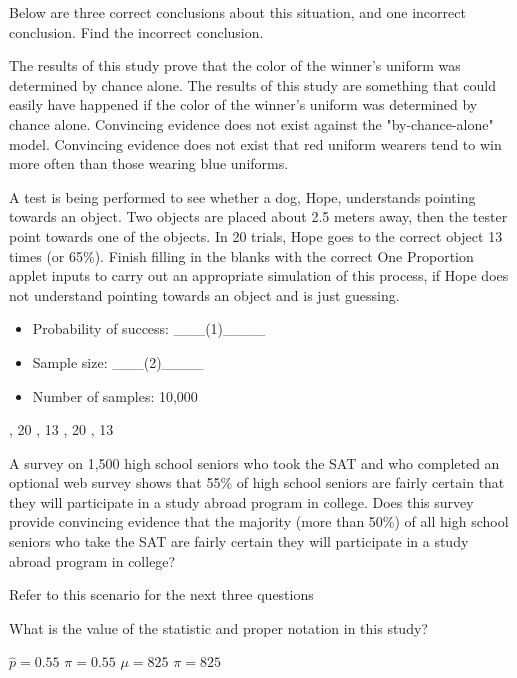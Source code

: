 \documentclass{article}
\begin{document}
\begin{mcquestions}
		\question[follow] Below are three correct conclusions about this situation, and one incorrect conclusion.  Find the incorrect conclusion.
		\begin{mcanswerslist}
		\answer[correct] The results of this study prove that the color of the winner's uniform was determined by chance alone.
		\answer The results of this study are something that could easily have happened if the color of the winner's uniform was determined by chance alone.
		\answer Convincing evidence does not exist against the "by-chance-alone" model.
		\answer Convincing evidence does not exist that red uniform wearers tend to win more often than those wearing blue uniforms.
		\end{mcanswerslist}
		
		\question A test is being performed to see whether a dog, Hope, understands pointing towards an object. Two objects are placed about 2.5 meters away, then the tester point towards one of the objects. In 20 trials, Hope goes to the correct object 13 times (or 65\%).
		Finish filling in the blanks with the correct One Proportion applet inputs to carry out an appropriate simulation of this process, if Hope does not understand pointing towards an object and is just guessing.
		\begin{itemize}
			\item Probability of success: \_\_\_(1)\_\_\_\_
			\item Sample size: \_\_\_(2)\_\_\_\_
			\item Number of samples: 10,000
		\end{itemize}
		\begin{mcanswerslist}
		\answer[correct] 0.5, 20
		\answer 0.65, 13
		\answer 0.65, 20
		\answer 0.5, 13
		\end{mcanswerslist}
		
		\begin{mcquestioninstruction}
			A survey on 1,500 high school seniors who took the SAT and who completed an optional web survey shows that 55\% of high school seniors are fairly certain that they will participate in a study abroad program in college. Does this survey provide convincing evidence that the majority (more than 50\%) of all high school seniors who take the SAT are fairly certain they will participate in a study abroad program in college?
			
			Refer to this scenario for the next three questions
		\end{mcquestioninstruction}
		
		\question What is the value of the statistic and proper notation in this study?
		\begin{mcanswerslist}
			\answer[correct] \(\hat p=0.55\)
			\answer \(\pi=0.55\)
			\answer \(\mu=825\)
			\answer \(\pi=825\)
		\end{mcanswerslist}		
		

\end{mcquestions}
\end{document}

